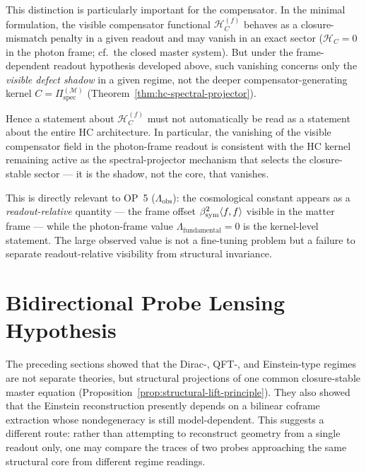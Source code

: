 \begin{remark}
\label{rem:hc-shadow-vs-core}
This distinction is particularly important for the compensator.
In the minimal formulation, the visible compensator functional
$\mathcal{H}_C^{(f)}$ behaves as a closure-mismatch penalty in a given
readout and may vanish in an exact sector ($\mathcal{H}_C = 0$ in the
photon frame; cf.\ the closed master system). But under the
frame-dependent readout hypothesis developed above, such vanishing
concerns only the \emph{visible defect shadow} in a given regime, not
the deeper compensator-generating kernel
$C = \Pi^{(\mathcal{M})}_{\mathrm{spec}}$
(Theorem~\ref{thm:hc-spectral-projector}).

Hence a statement about $\mathcal{H}_C^{(f)}$ must not automatically be
read as a statement about the entire HC architecture. In particular, the
vanishing of the visible compensator field in the photon-frame readout
is consistent with the HC kernel remaining active as the
spectral-projector mechanism that selects the closure-stable sector ---
it is the shadow, not the core, that vanishes.

This is directly relevant to OP~5 ($\Lambda_{\mathrm{obs}}$): the
cosmological constant appears as a \emph{readout-relative} quantity ---
the frame offset $\beta_{\mathrm{sym}}^2\langle f,f\rangle$ visible in the matter frame
--- while the photon-frame value $\Lambda_{\mathrm{fundamental}} = 0$
is the kernel-level statement. The large observed value is not a
fine-tuning problem but a failure to separate readout-relative visibility
from structural invariance.
\end{remark}


\section{Bidirectional Probe Lensing Hypothesis}
\label{sec:bidirectional-probe-lensing}

The preceding sections showed that the Dirac-, QFT-, and Einstein-type
regimes are not separate theories, but structural projections of one
common closure-stable master equation
(Proposition~\ref{prop:structural-lift-principle}). They also showed
that the Einstein reconstruction presently depends on a bilinear coframe
extraction whose nondegeneracy is still model-dependent. This suggests a
different route: rather than attempting to reconstruct geometry from a
single readout only, one may compare the traces of two probes approaching
the same structural core from different regime readings.

